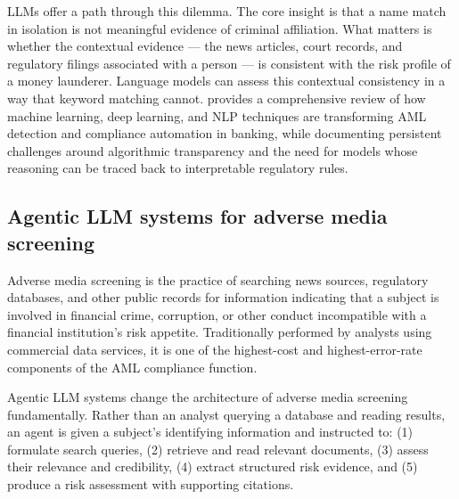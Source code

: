 LLMs offer a path through this dilemma. The core insight is that a name match in isolation is not meaningful evidence of criminal affiliation. What matters is whether the contextual evidence --- the news articles, court records, and regulatory filings associated with a person --- is consistent with the risk profile of a money launderer. Language models can assess this contextual consistency in a way that keyword matching cannot. \citet{Shirvanporzour2025} provides a comprehensive review of how machine learning, deep learning, and NLP techniques are transforming AML detection and compliance automation in banking, while documenting persistent challenges around algorithmic transparency and the need for models whose reasoning can be traced back to interpretable regulatory rules.

\subsection{Agentic LLM systems for adverse media screening}
\label{sec:ch11-agentic-adverse-media}

Adverse media screening is the practice of searching news sources, regulatory databases, and other public records for information indicating that a subject is involved in financial crime, corruption, or other conduct incompatible with a financial institution's risk appetite. Traditionally performed by analysts using commercial data services, it is one of the highest-cost and highest-error-rate components of the AML compliance function.

Agentic LLM systems change the architecture of adverse media screening fundamentally. Rather than an analyst querying a database and reading results, an agent is given a subject's identifying information and instructed to: (1) formulate search queries, (2) retrieve and read relevant documents, (3) assess their relevance and credibility, (4) extract structured risk evidence, and (5) produce a risk assessment with supporting citations.

